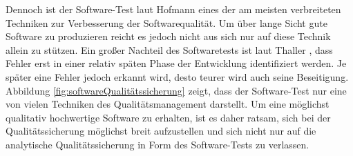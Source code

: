 Dennoch ist der Software-Test laut Hofmann \cite[vgl. S.22]{hoffmann_software-qualitat_2013} eines der am meisten verbreiteten Techniken zur Verbesserung der Softwarequalität. Um über lange Sicht gute Software zu produzieren reicht es jedoch nicht aus sich nur auf diese Technik allein zu stützen. Ein großer Nachteil des Softwaretests ist laut Thaller \cite[vgl. S.18]{thaller_software-test_2002}, dass Fehler erst in einer relativ späten Phase der Entwicklung identifiziert werden. Je später eine Fehler jedoch erkannt wird, desto teurer wird auch seine Beseitigung. Abbildung \ref{fig:softwareQualitätssicherung} zeigt, dass der Software-Test nur eine von vielen Techniken des Qualitätsmanagement darstellt. Um eine möglichst qualitativ hochwertige Software zu erhalten, ist es daher ratsam, sich bei der Qualitätssicherung möglichst breit aufzustellen und sich nicht nur auf die analytische Qualitätssicherung in Form des Software-Tests zu verlassen. 


